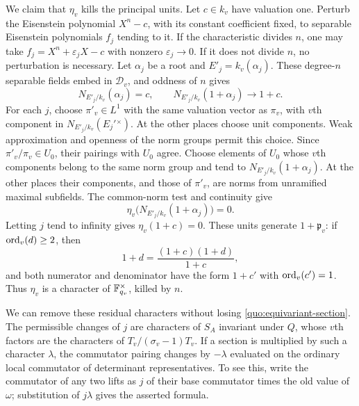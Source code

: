 We claim that $\eta_v$ kills the principal units.  Let $c\in k_v$
have valuation one.  Perturb the Eisenstein polynomial $X^n-c$, with
its constant coefficient fixed, to separable Eisenstein polynomials
$f_j$ tending to it.  If the characteristic divides $n$, one may take
$f_j=X^n+\varepsilon_jX-c$ with nonzero
$\varepsilon_j\to0$.  If it does not divide $n$, no perturbation is
necessary.  Let $\alpha_j$ be a root and $E'_j=k_v(\alpha_j)$.
These degree-$n$ separable fields embed in $\mathcal D_v$, and oddness
of $n$ gives
\[
 N_{E'_j/k_v}(\alpha_j)=c,
 \qquad
 N_{E'_j/k_v}(1+\alpha_j)\longrightarrow1+c.
\]
For each $j$, choose $\pi'_v\in L^1$ with the same valuation vector
as $\pi_v$, with $v$th component in $N_{E'_j/k_v}(E_j'{}^\times)$.
At the other places choose unit components.  Weak approximation and
openness of the norm groups permit this choice.  Since
$\pi'_v/\pi_v\in U_0$, their pairings with $U_0$ agree.
Choose elements of $U_0$ whose $v$th components belong to the same
norm group and tend to $N_{E'_j/k_v}(1+\alpha_j)$.
At the other places their components, and those of $\pi'_v$, are
norms from unramified maximal subfields.  The common-norm test and
continuity give
\[
 \eta_v\bigl(N_{E'_j/k_v}(1+\alpha_j)\bigr)=0.
\]
Letting $j$ tend to infinity gives $\eta_v(1+c)=0$.
These units generate $1+\mathfrak p_v$: if $\operatorname{ord}_v(d)\geq2$, then
\[
 1+d=\frac{(1+c)(1+d)}{1+c},
\]
and both numerator and denominator have the form $1+c'$ with
$\operatorname{ord}_v(c')=1$.  Thus $\eta_v$ is a character of
$\mathbb F_{q_v}^\times$, killed by $n$.

We can remove these residual characters without losing
\eqref{quo:equivariant-section}.  The permissible changes of $j$ are
characters of $S_A$ invariant under $Q$, whose $v$th factors are the
characters of $T_v/(\sigma_v-1)T_v$.  If a section is multiplied by
such a character $\lambda$, the commutator pairing changes by
$-\lambda$ evaluated on the ordinary local commutator of determinant
representatives.  To see this, write the commutator of any two lifts
as $j$ of their base commutator times the old value of $\omega$;
substitution of $j\lambda$ gives the asserted formula.

